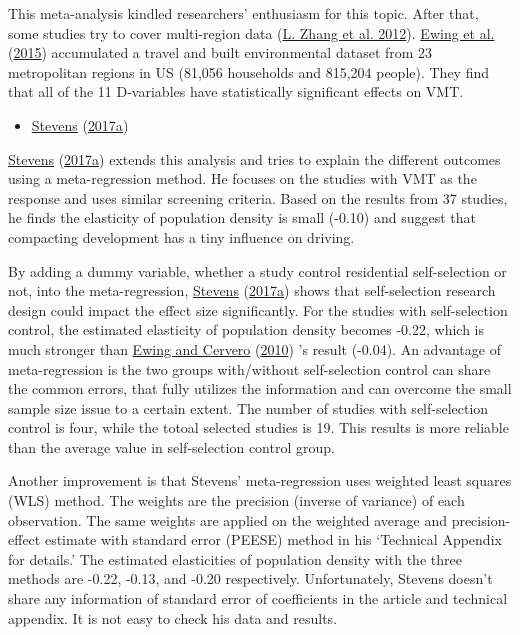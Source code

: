 \documentclass[
  11pt,
  openany]{memoir}
\providecommand{\tightlist}{%
  \setlength{\itemsep}{0pt}\setlength{\parskip}{0pt}}
\begin{document}
This meta-analysis kindled researchers' enthusiasm for this topic. After that, some studies try to cover multi-region data (\protect\hyperlink{ref-zhangHowBuiltEnvironment2012}{L. Zhang et al. 2012}). \protect\hyperlink{ref-ewingVaryingInfluencesBuilt2015}{Ewing et al.} (\protect\hyperlink{ref-ewingVaryingInfluencesBuilt2015}{2015}) accumulated a travel and built environmental dataset from 23 metropolitan regions in US (81,056 households and 815,204 people). They find that all of the 11 D-variables have statistically significant effects on VMT.

\begin{itemize}
\tightlist
\item
  \protect\hyperlink{ref-stevensDoesCompactDevelopment2017}{Stevens} (\protect\hyperlink{ref-stevensDoesCompactDevelopment2017}{2017a})
\end{itemize}

\protect\hyperlink{ref-stevensDoesCompactDevelopment2017}{Stevens} (\protect\hyperlink{ref-stevensDoesCompactDevelopment2017}{2017a}) extends this analysis and tries to explain the different outcomes using a meta-regression method. He focuses on the studies with VMT as the response and uses similar screening criteria. Based on the results from 37 studies, he finds the elasticity of population density is small (-0.10) and suggest that compacting development has a tiny influence on driving.

By adding a dummy variable, whether a study control residential self-selection or not, into the meta-regression, \protect\hyperlink{ref-stevensDoesCompactDevelopment2017}{Stevens} (\protect\hyperlink{ref-stevensDoesCompactDevelopment2017}{2017a}) shows that self-selection research design could impact the effect size significantly. For the studies with self-selection control, the estimated elasticity of population density becomes -0.22, which is much stronger than \protect\hyperlink{ref-ewingTravelBuiltEnvironment2010}{Ewing and Cervero} (\protect\hyperlink{ref-ewingTravelBuiltEnvironment2010}{2010}) 's result (-0.04). An advantage of meta-regression is the two groups with/without self-selection control can share the common errors, that fully utilizes the information and can overcome the small sample size issue to a certain extent. The number of studies with self-selection control is four, while the totoal selected studies is 19. This results is more reliable than the average value in self-selection control group.

Another improvement is that Stevens' meta-regression uses weighted least squares (WLS) method. The weights are the precision (inverse of variance) of each observation. The same weights are applied on the weighted average and precision-effect estimate with standard error (PEESE) method in his `Technical Appendix for details.' The estimated elasticities of population density with the three methods are -0.22, -0.13, and -0.20 respectively. Unfortunately, Stevens doesn't share any information of standard error of coefficients in the article and technical appendix. It is not easy to check his data and results.
\end{document}
